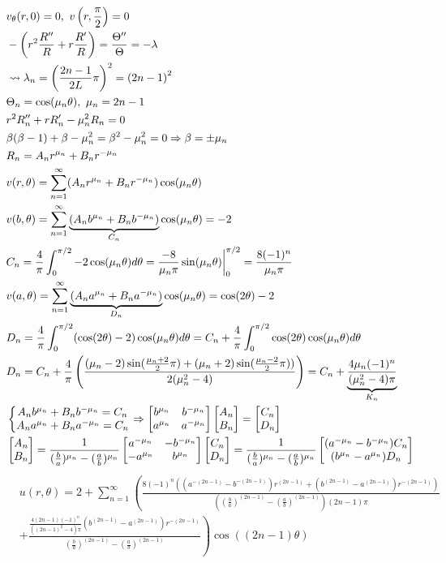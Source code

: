\documentclass[11pt, fleqn]{article}
\begin{document}
\begin{align*}
    &v_\theta(r,0)=0,\ v\brround{r,\frac{\pi}{2}}=0\\
    &-\brround{r^2\frac{R''}{R}+r\frac{R'}{R}}=\frac{\Theta''}{\Theta}=-\lambda\\
    &\leadsto\lambda_n=\brround{\frac{2n-1}{2L}\pi}^2=\brround{2n-1}^2\\
    &\Theta_n=\cos(\mu_n\theta),\ \mu_n=2n-1\\
    &r^2R_n''+rR_n'-\mu_n^2R_n=0\\
    &\beta(\beta-1)+\beta-\mu_n^2=\beta^2-\mu_n^2=0\Ra \beta=\pm\mu_n\\
    &R_n=A_nr^{\mu_n}+B_nr^{-\mu_n}\\
    &v(r,\theta)=\sum_{n=1}^\infty(A_nr^{\mu_n}+B_nr^{-\mu_n})\cos(\mu_n\theta)\\
    &v(b,\theta)=\sum_{n=1}^\infty\underbrace{(A_nb^{\mu_n}+B_nb^{-\mu_n})}_{C_n}\cos(\mu_n\theta)=-2\\
    &C_n=\frac{4}{\pi}\int_0^{\pi/2}-2\cos(\mu_n\theta)d\theta=\frac{-8}{\mu_n\pi}\sin(\mu_n\theta)\eval_0^{\pi/2}=\frac{8(-1)^n}{\mu_n\pi}\\
    &v(a,\theta)=\sum_{n=1}^\infty\underbrace{(A_na^{\mu_n}+B_na^{-\mu_n})}_{D_n}\cos(\mu_n\theta)=\cos(2\theta)-2\\
    &D_n=\frac{4}{\pi}\int_0^{\pi/2}(\cos(2\theta)-2)\cos(\mu_n\theta)d\theta=C_n+\frac{4}{\pi}\int_0^{\pi/2}\cos(2\theta)\cos(\mu_n\theta)d\theta\\
    &D_n=C_n+\frac{4}{\pi}\brround{\frac{(\mu_n-2)\sin(\frac{\mu_n+2}{2}\pi)+(\mu_n+2)\sin(\frac{\mu_n-2}{2}\pi))}{2(\mu_n^2-4)}}=C_n+\underbrace{\frac{4\mu_n(-1)^n}{(\mu_n^2-4)\pi}}_{K_n}\\
    &\eqnsystem{A_nb^{\mu_n}+B_nb^{-\mu_n}=C_n\\ A_na^{\mu_n}+B_na^{-\mu_n}=C_n}\Ra \matrixx{b^{\mu_n} & b^{-\mu_n}\\ a^{\mu_n} & a^{-\mu_n}}\matrixx{A_n\\B_n}=\matrixx{C_n\\D_n}\\
    &\matrixx{A_n\\B_n}=\frac{1}{(\frac{b}{a})^{\mu_n}-(\frac{a}{b})^{\mu_n}}\matrixx{a^{-\mu_n} & -b^{-\mu_n}\\ -a^{\mu_n} & b^{\mu_n}}\matrixx{C_n\\D_n}=\frac{1}{(\frac{b}{a})^{\mu_n}-(\frac{a}{b})^{\mu_n}}\matrixx{(a^{-\mu_n}-b^{-\mu_n})C_n\\ (b^{\mu_n}-a^{\mu_n})D_n}
\end{align*}
\begin{align*}
    &u(r,\theta)=2+\sum_{n=1}^\infty\left(\frac{8(-1)^n((a^{-(2n-1)}-b^{-(2n-1)})r^{(2n-1)}+(b^{(2n-1)}-a^{(2n-1)})r^{-(2n-1)})}{((\frac{b}{a})^{(2n-1)}-(\frac{a}{b})^{(2n-1)})(2n-1)\pi}\right.\\
    &\left.+\frac{\frac{4(2n-1)(-1)^n}{((2n-1)^2-4)\pi}(b^{(2n-1)}-a^{(2n-1)})r^{-(2n-1)}}{(\frac{b}{a})^{(2n-1)}-(\frac{a}{b})^{(2n-1)}}\right)\cos((2n-1)\theta)
\end{align*}
\end{document}

